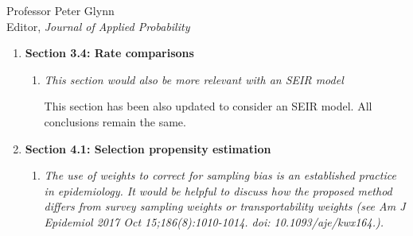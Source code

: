 \documentclass[11pt]{letter} %
\begin{document}
\begin{letter}{Professor
	Peter Glynn\\
	Editor, {\em Journal of Applied Probability}}
\begin{enumerate}
\begin{enumerate}
	\noindent Note that for the SIR model, the basic reproduction number is~$R_0 = 1 + \frac{1}{\gamma} \Lambda$. So estimate of the instantaneous reproduction number is obatined by replacing $\Lambda$ by an estimate of the  instantaneous growth rate $\hat \Lambda_t = \log (K_t / K_{t-1})$.  Then using the approximate relationship between the SEIR model and an SIR model with infectious period $1/\gamma + 1/\sigma$, we arrive at the new moment-based estimator
	$$
    R_t \approx 1 + \left( \frac{1}{\gamma} + \frac{1}{\sigma} \right) \log \left( \frac{K_t}{K_{t-1}} \right).
	$$
	The updated $R_t$ estimator shows that the same intuition about the error holds when we are considering an SEIR rather than an SIR model.  Figure 3b shows the reproduction number estimates and potential biases under SEIR dynamics which shows the same general conclusions hold.  For completeness, we also present the instantaneous reproduction number estimates using the proposal of Cori et. al. (2014) in Section I of the supplementary materials, which shows the same general conclusions.
\end{enumerate}
\item {\bf Section 3.4: Rate comparisons}
\begin{enumerate}
	\item {\it This section would also be more relevant with an SEIR model}
	\vspace{5mm}

	This section has been also updated to consider an SEIR model.  All conclusions remain the same.
	\vspace{5mm}
\end{enumerate}
\item {\bf Section 4.1: Selection propensity estimation}
\begin{enumerate}
	\item {\it The use of weights to correct for sampling bias is an established practice in epidemiology. It would be helpful to discuss how the proposed method differs from survey sampling weights or transportability weights (see Am J Epidemiol 2017 Oct 15;186(8):1010-1014. doi: 10.1093/aje/kwx164.).}
	\vspace{5mm}


\end{enumerate}
\end{enumerate}
\end{letter}
\end{document}
